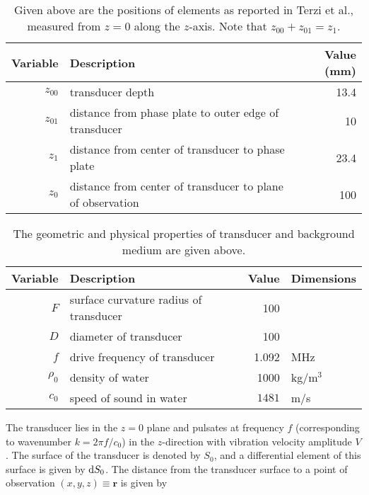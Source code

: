 \documentclass[12pt]{article}%
\begin{document}
\begin{table}
\centering
\begin{tabular}{ r | l | r } 
 \textbf{Variable} & \textbf{Description} & \textbf{Value} (mm)\\
 \hline
 $z_{00}$ & transducer depth & 13.4\\
 $z_{01}$ & distance from phase plate to outer edge of transducer & 10\\
 $z_{1}$ & distance from center of transducer to phase plate & 23.4\\
 $z_{0}$ & distance from center of transducer to plane of observation & 100
\end{tabular}
\caption{Given above are the positions of elements as reported in Terzi et al., measured from $z=0$ along the $z$-axis. Note that $z_{00} + z_{01} = z_1$.}\label{geometrytable}
\end{table}


\begin{table}
\centering
\begin{tabular}{ r | l | r l } 
 \textbf{Variable} & \textbf{Description} & \textbf{Value} & \textbf{Dimensions} \\
 \hline
 $F$ & surface curvature radius of transducer& 100\\
 $D$ & diameter of transducer & 100\\
 $f$ & drive frequency of transducer & 1.092 & MHz\\
 $\rho_0 $ & density of water & 1000 & kg/m$^3$\\
 $c_0$ & speed of sound in water & $1481 $ & m/s
\end{tabular}
\caption{The geometric and physical properties of transducer and background medium are given above.}\label{materialtable}
\end{table}


\iffalse
$R$ &  & distance from $\dif S$ to point of observation\\
 & $\neq e^{j\omega t}$!!& time convention\\
$\varphi$ & $=\arctan (y/x)$ & polar angle\\
$l$& $=0,1,2,\dots$ & orbital number\\
\fi


The \color{magenta}transducer \color{black}  lies in the $z=0$ plane and pulsates at frequency $f$ (corresponding to wavenumber $k = 2\pi f/c_0$) in the $z$-direction with vibration velocity amplitude $V$. The surface of the transducer is denoted by \color{magenta}$S_0$\color{black}, and a differential element of this surface is given by \color{magenta}$\dif S_0$\color{black}. The distance from the transducer surface to a point of observation $(x,y,z) \equiv \boldsymbol r$ is given by \color{magenta} 
\end{document}
